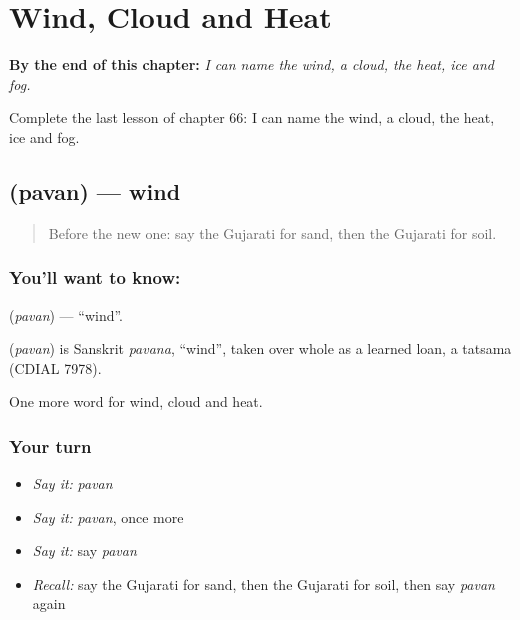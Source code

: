 
\chapter{Wind, Cloud and Heat}
\label{ch:gu-wind-cloud-and-heat}

\begin{chapteropening}
\textbf{By the end of this chapter:} \emph{I can name the wind, a cloud, the heat, ice and fog.}

Complete the last lesson of chapter 66: I can name the wind, a cloud, the heat, ice and fog.
\end{chapteropening}

\section[\texorpdfstring{\gu{પવન} (pavan)}{પવન (pavan)}]{ (pavan) — wind}

\label{lesson:GU-C66-wind}



\begin{quote}
Before the new one: say the Gujarati for sand, then the Gujarati for soil.
\end{quote}

\subsection*{You'll want to know: }
\textbf{} (\emph{pavan}) — \textquotedblleft{}wind\textquotedblright{}.

\begin{cousinweb}
\textbf{} (\emph{pavan}) is Sanskrit \emph{pavana}, \textquotedblleft{}wind\textquotedblright{}, taken over whole as a learned loan, a tatsama (CDIAL 7978).
\end{cousinweb}

\begin{grammarlens}[title={What you've built}]
One more word for wind, cloud and heat.
\end{grammarlens}

\subsection*{Your turn}
\begin{itemize}
\raggedright
  \item \emph{Say it:} \emph{pavan}
  \item \emph{Say it:} \emph{pavan}, once more
  \item \emph{Say it:} say \emph{pavan}
  \item \emph{Recall:} say the Gujarati for sand, then the Gujarati for soil, then say \emph{pavan} again
\end{itemize}

